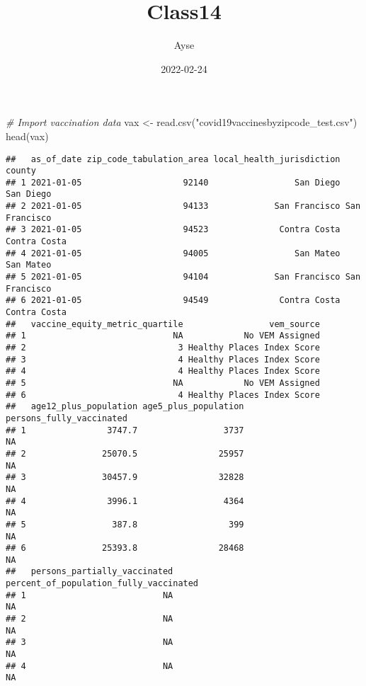 \documentclass[
]{article}
\title{Class14}
\author{Ayse}
\date{2022-02-24}
\newenvironment{Shaded}{\begin{snugshade}}{\end{snugshade}}
\newcommand{\CommentTok}[1]{\textcolor[rgb]{0.56,0.35,0.01}{\textit{#1}}}
\newcommand{\FunctionTok}[1]{\textcolor[rgb]{0.00,0.00,0.00}{#1}}
\newcommand{\NormalTok}[1]{#1}
\newcommand{\OtherTok}[1]{\textcolor[rgb]{0.56,0.35,0.01}{#1}}
\newcommand{\StringTok}[1]{\textcolor[rgb]{0.31,0.60,0.02}{#1}}
\begin{document}
\maketitle

\begin{Shaded}
\begin{Highlighting}[]
\CommentTok{\# Import vaccination data}
\NormalTok{vax }\OtherTok{\textless{}{-}} \FunctionTok{read.csv}\NormalTok{(}\StringTok{"covid19vaccinesbyzipcode\_test.csv"}\NormalTok{)}
\FunctionTok{head}\NormalTok{(vax)}
\end{Highlighting}
\end{Shaded}

\begin{verbatim}
##   as_of_date zip_code_tabulation_area local_health_jurisdiction        county
## 1 2021-01-05                    92140                 San Diego     San Diego
## 2 2021-01-05                    94133             San Francisco San Francisco
## 3 2021-01-05                    94523              Contra Costa  Contra Costa
## 4 2021-01-05                    94005                 San Mateo     San Mateo
## 5 2021-01-05                    94104             San Francisco San Francisco
## 6 2021-01-05                    94549              Contra Costa  Contra Costa
##   vaccine_equity_metric_quartile                 vem_source
## 1                             NA            No VEM Assigned
## 2                              3 Healthy Places Index Score
## 3                              4 Healthy Places Index Score
## 4                              4 Healthy Places Index Score
## 5                             NA            No VEM Assigned
## 6                              4 Healthy Places Index Score
##   age12_plus_population age5_plus_population persons_fully_vaccinated
## 1                3747.7                 3737                       NA
## 2               25070.5                25957                       NA
## 3               30457.9                32828                       NA
## 4                3996.1                 4364                       NA
## 5                 387.8                  399                       NA
## 6               25393.8                28468                       NA
##   persons_partially_vaccinated percent_of_population_fully_vaccinated
## 1                           NA                                     NA
## 2                           NA                                     NA
## 3                           NA                                     NA
## 4                           NA                                     NA

\end{verbatim}
\end{document}

